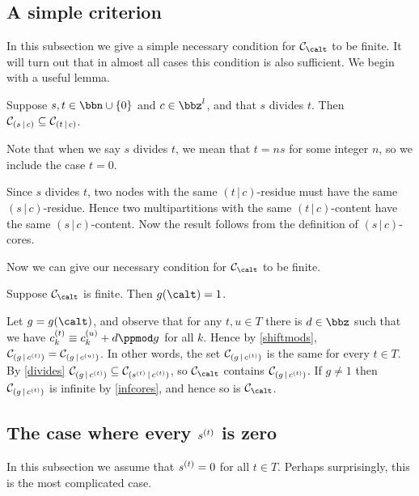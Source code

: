 \documentclass[a4paper, 11pt, twoside]{article}
\begin{document}
\subsection{A simple criterion}

In this subsection we give a simple necessary condition for $\smc\calt$ to be finite. It will turn out that in almost all cases this condition is also sufficient. We begin with a useful lemma.

\begin{lemma}\label{divides}
Suppose $s,t\in\bbn\cup\{0\}$ and $c\in\bbz^l$, and that $s$ divides $t$. Then $\mathcal{C}_{(s\,|\,c)}\subseteq\mathcal{C}_{(t\,|\,c)}$.
\end{lemma}

Note that when we say $s$ divides $t$, we mean that $t=ns$ for some integer $n$, so we include the case $t=0$.

\begin{pf}
Since $s$ divides $t$, two nodes with the same $(t\,|\,c)$-residue must have the same $(s\,|\,c)$-residue. Hence two multipartitions with the same $(t\,|\,c)$-content have the same $(s\,|\,c)$-content. Now the result follows from the definition of $(s\,|\,c)$-cores.
\end{pf}

Now we can give our necessary condition for $\smc\calt$ to be finite.

\begin{cory}\label{gnot1}
Suppose $\smc\calt$ is finite. Then $g(\calt)=1$.
\end{cory}

\begin{pf}
Let $g=g(\calt)$, and observe that for any $t,u\in T$ there is $d\in\bbz$ such that we have $\sof ct_k\equiv\sof cu_k+d\ppmod g$ for all $k$. Hence by \cref{shiftmods}, $\mathcal{C}_{(g\,|\,c^{(t)})}=\mathcal{C}_{(g\,|\,c^{(u)})}$. In other words, the set $\mathcal{C}_{(g\,|\,c^{(t)})}$ is the same for every $t\in T$. By \cref{divides} $\mathcal{C}_{(g\,|\,c^{(t)})}\subseteq\mathcal{C}_{(s^{(t)}\,|\,c^{(t)})}$, so $\smc\calt$ contains $\mathcal{C}_{(g\,|\,c^{(t)})}$. If $g\neq1$ then $\mathcal{C}_{(g\,|\,c^{(t)})}$ is infinite by \cref{infcores}, and hence so is $\smc\calt$.
\end{pf}


\subsection{The case where every $s^{(t)}$ is zero}

In this subsection we assume that $s^{(t)}=0$ for all $t\in T$. Perhaps surprisingly, this is the most complicated case.%
\end{document}
